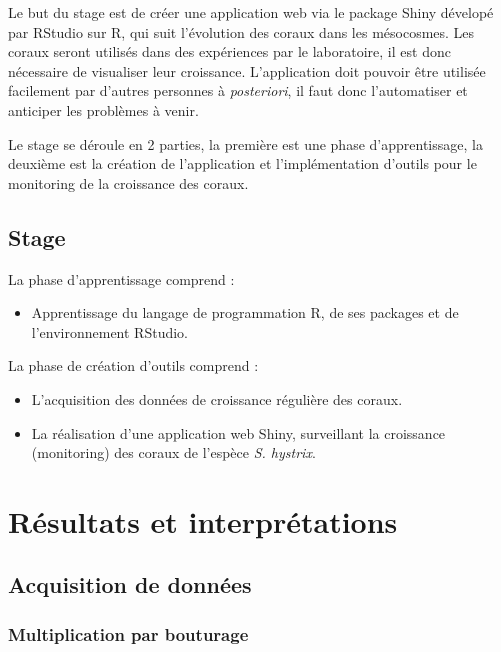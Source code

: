 \documentclass[]{report}
\providecommand{\tightlist}{%
  \setlength{\itemsep}{0pt}\setlength{\parskip}{0pt}}
\begin{document}
Le but du stage est de créer une application web via le package Shiny
dévelopé par RStudio sur R, qui suit l'évolution des coraux dans les
mésocosmes. Les coraux seront utilisés dans des expériences par le
laboratoire, il est donc nécessaire de visualiser leur croissance.
L'application doit pouvoir être utilisée facilement par d'autres
personnes à \emph{posteriori}, il faut donc l'automatiser et anticiper
les problèmes à venir.

Le stage se déroule en 2 parties, la première est une phase
d'apprentissage, la deuxième est la création de l'application et
l'implémentation d'outils pour le monitoring de la croissance des
coraux.

\section{Stage}\label{stage}

La phase d'apprentissage comprend :

\begin{itemize}
\tightlist
\item
  Apprentissage du langage de programmation R, de ses packages et de
  l'environnement RStudio.
\end{itemize}

La phase de création d'outils comprend :

\begin{itemize}
\item
  L'acquisition des données de croissance régulière des coraux.
\item
  La réalisation d'une application web Shiny, surveillant la croissance
  (monitoring) des coraux de l'espèce \emph{S. hystrix}.
\end{itemize}

\chapter{Résultats et
interprétations}\label{resultats-et-interpretations}

\section{Acquisition de données}\label{acquisition-de-donnees}

\subsection{Multiplication par
bouturage}\label{multiplication-par-bouturage}
\end{document}
